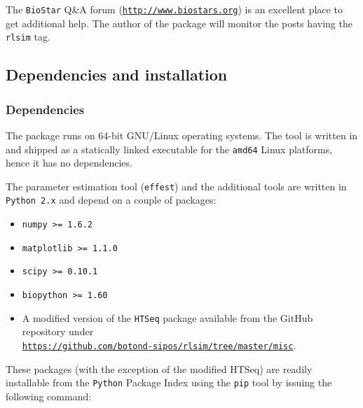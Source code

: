 The {\tt BioStar} Q\&A forum (\href{http://www.biostars.org}{\tt http://www.biostars.org}) is an excellent place to get additional help. The author of the package will monitor the posts having the \texttt{rlsim} tag.

\subsection{Dependencies and installation}
\label{ss:dep_install}

\subsubsection{Dependencies}
\label{sss:dep}

The package runs on 64-bit GNU/Linux operating systems.
The \rlsim tool is written in \go \cite{golang} and shipped as a statically linked executable for the \texttt{amd64} Linux platforms, hence it has no dependencies.


The parameter estimation tool (\texttt{effest}) and the additional tools are written in \texttt{Python 2.x} and depend on a couple of packages:

\begin{itemize}
\item \texttt{numpy >= 1.6.2} \cite{numpy}
\item \texttt{matplotlib >= 1.1.0} \cite{plt}
\item \texttt{scipy >= 0.10.1} \cite{scipy}
\item \texttt{biopython >= 1.60} \cite{biopython}
\item{A modified version of the \texttt{HTSeq} \cite{htseq} package available from the GitHub repository under\\
\texttt{\href{https://github.com/botond-sipos/rlsim/tree/master/misc}{https://github.com/botond-sipos/rlsim/tree/master/misc}}.

}
\end{itemize}

These packages (with the exception of the modified HTSeq) are readily installable from the \texttt{Python} Package Index \cite{pypi} using the \texttt{pip} tool by issuing the following command:

